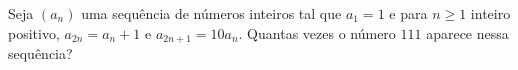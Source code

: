 Seja $(a_n)$ uma sequência de números inteiros tal que $a_1 = 1$ e para $n \ge 1$ inteiro positivo, $a_{2n} = a_n + 1$ e $a_{2n+1} = 10a_n$. Quantas vezes o número $111$ aparece nessa sequência?